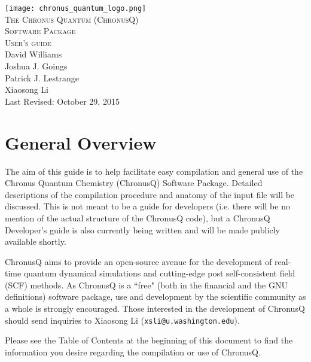 \documentclass[12pt]{article}
\makeatletter
\newcommand{\XiaosongContact}{Xiaosong Li (\texttt{xsli@u.washington.edu})}
\makeatother
\begin{document}
  \begin{titlepage}
    \vspace*{\fill}
    \begin{center}
      \texttt{[image: chronus\_quantum\_logo.png]}~\\[1cm]
      \textsc{\LARGE The Chronus Quantum (ChronusQ) \\ Software Package}~\\[0.5cm]
      \textsc{\Large User's guide}~\\[5cm]
      \large David Williams\\
      \large Joshua J. Goings\\
      \large Patrick J. Lestrange\\
      \large Xiaosong Li \\[1.5cm]
      \large Last Revised: October 29, 2015
    \end{center}
    \vspace*{\fill}
  \end{titlepage}
  \tableofcontents

  \newpage

  \section{General Overview} \label{sec:GeneralOverView}

  The aim of this guide is to help facilitate easy compilation and general use of
  the Chronus Quantum Chemistry (ChronusQ) Software Package. Detailed descriptions
  of the compilation procedure and anatomy of the input file will be discussed.
  This is not meant to be a guide for developers (i.e. there will be no mention of
  the actual structure of the ChronusQ code), but a ChronusQ Developer's guide is
  also currently being written and will be made publicly available shortly.

  ChronusQ aims to provide an open-source avenue for the development of real-time
  quantum dynamical simulations and cutting-edge post self-consistent field (SCF)
  methods.  As ChronusQ is a ``free" (both in the financial and the GNU definitions)  
  software package, use and development by the scientific community as a whole is 
  strongly encouraged. Those interested in the development of ChronusQ should send 
  inquiries to \XiaosongContact.

  Please see the Table of Contents at the beginning of this document to find
  the information you desire regarding the compilation or use of ChronusQ.
\end{document}
